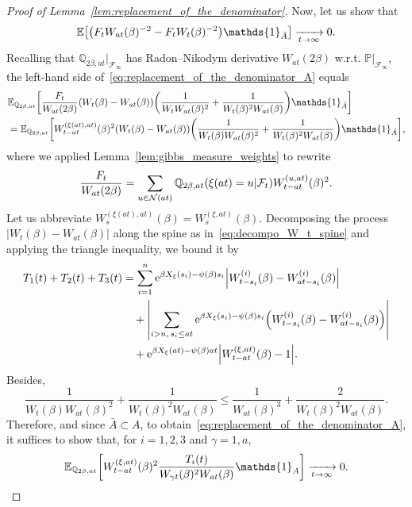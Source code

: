 \documentclass[AHL,Unicode,longabstracts,published]{cedram}
\newcommand{\e}{\mathrm{e}}
\newcommand{\E}{\mathbb{E}}
\renewcommand{\P}{\mathbb{P}}
\newcommand{\Q}{\mathbb{Q}}
\newcommand\1{\mathds{1}}
\newcommand{\cF}{\mathcal{F}}
\newcommand{\cN}{\mathcal{N}}
\let\originalleft\left
\let\originalright\right
\renewcommand{\left}{\mathopen{}\mathclose\bgroup\originalleft}
\renewcommand{\right}{\aftergroup\egroup\originalright}
\renewcommand*{\to}{\mathchoice{\longrightarrow}{\rightarrow}{\rightarrow}{\rightarrow}}
\begin{document}
\begin{proof}[Proof of Lemma~\ref{lem:replacement_of_the_denominator}]
Now, let us show that
\begin{equation}\label{eq:replacement_of_the_denominator_A}
\E\left[\left(F_t W_{at}(\beta)^{-2} - F_t W_t(\beta)^{-2}\right) \1_{\bar{A}}\right] \xrightarrow[t \to \infty]{} 0.
\end{equation}
Recalling that $\Q_{2\beta, at}|_{\cF_\infty}$ has Radon--Nikodym derivative $W_{at}(2\beta)$ w.r.t. $\P|_{\cF_\infty}$, the left-hand side of~\eqref{eq:replacement_of_the_denominator_A} equals
\begin{align*}
&\E_{\Q_{2\beta, at}} \left[\frac{F_t}{W_{at}(2\beta)} (W_t(\beta) - W_{at}(\beta)) \left(\frac{1}{W_t W_{at}(\beta)^2} + \frac{1}{W_t(\beta)^2 W_{at}(\beta)} \right) \1_{\bar{A}} \right]  \\
&= \E_{\Q_{2\beta, at}} \left[W_{t - at}^{(\xi(at), at)}(\beta)^2 (W_t(\beta) - W_{at}(\beta)) \left(\frac{1}{W_t(\beta) W_{at}(\beta)^2} + \frac{1}{W_t(\beta)^2 W_{at}(\beta)} \right) \1_{\bar{A}} \right],
\end{align*}
where we applied Lemma~\ref{lem:gibbs_measure_weights} to rewrite
\begin{equation*}
\frac{F_t}{W_{at}(2\beta)} = \sum_{u \in \cN(at)} \Q_{2\beta, at} \left(\xi(at) = u \middle| \cF_t \right) W_{t - at}^{(u, at)}(\beta)^2.
\end{equation*}
Let us abbreviate $W_s^{(\xi(at), at)}(\beta) = W_s^{(\xi, at)}(\beta)$. Decomposing the process $|W_t(\beta) - W_{at}(\beta)|$ along the spine as in~\eqref{eq:decompo_W_t_spine} and applying the triangle inequality, we bound it by
\begin{align*}
T_1(t) + T_2(t) + T_3(t)  &= \sum_{i = 1}^n \e^{\beta X_\xi(s_i) - \psi(\beta)s_i} \left|W_{t - s_i}^{(i)}(\beta) - W_{at - s_i}^{(i)}(\beta)\right|  \\
&\quad+ \left| \sum_{i > n,\, s_i \leq at} \e^{\beta X_\xi(s_i) - \psi(\beta)s_i} \left(W_{t - s_i}^{(i)}(\beta) - W_{at - s_i}^{(i)}(\beta)\right) \right| \\
&\quad+ \e^{\beta X_\xi(at) - \psi(\beta)at} \left|W_{t - at}^{(\xi, at)}(\beta) - 1\right|.
\end{align*}
Besides,
\begin{equation*}
\frac{1}{W_t(\beta) W_{at}(\beta)^2} + \frac{1}{W_t(\beta)^2 W_{at}(\beta)} \leq \frac{1}{W_{at}(\beta)^3} + \frac{2}{W_t(\beta)^2 W_{at}(\beta)}.
\end{equation*}
Therefore, and since $\bar{A} \subset A$, to obtain~\eqref{eq:replacement_of_the_denominator_A}, it suffices to show that, for $i = 1,2,3$ and $\gamma = 1, a$,
\begin{equation}\label{eq:replacement_of_the_denominator_A_reformulation}
\E_{\Q_{2\beta, at}} \left[W_{t - at}^{(\xi, at)}(\beta)^2 \frac{T_i(t)}{W_{\gamma t}(\beta)^2 W_{at}(\beta)} \1_A \right] \xrightarrow[t \to \infty]{} 0.
\end{equation}


\end{proof}
\end{document}
